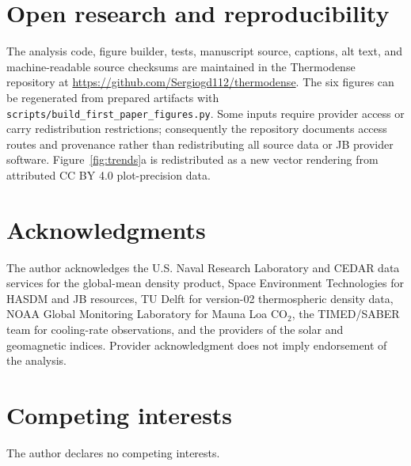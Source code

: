 \documentclass[11pt]{article}
\begin{document}
\section*{Open research and reproducibility}

The analysis code, figure builder, tests, manuscript source, captions, alt text,
and machine-readable source checksums are maintained in the Thermodense
repository at \url{https://github.com/Sergiogd112/thermodense}.  The six figures
can be regenerated from prepared artifacts with
\texttt{scripts/build\_first\_paper\_figures.py}.  Some inputs require provider
access or carry redistribution restrictions; consequently the repository
documents access routes and provenance rather than redistributing all source
data or JB provider software.  Figure~\ref{fig:trends}a is redistributed as a
new vector rendering from attributed CC BY 4.0 plot-precision data.

\section*{Acknowledgments}

The author acknowledges the U.S. Naval Research Laboratory and CEDAR data
services for the global-mean density product, Space Environment Technologies
for HASDM and JB resources, TU Delft for version-02 thermospheric density data,
NOAA Global Monitoring Laboratory for Mauna Loa CO$_2$, the TIMED/SABER team for
cooling-rate observations, and the providers of the solar and geomagnetic
indices.  Provider acknowledgment does not imply endorsement of the analysis.

\section*{Competing interests}
The author declares no competing interests.



\end{document}
